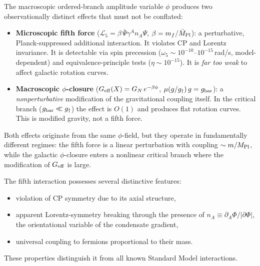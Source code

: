 \documentclass[11pt,a4paper]{article}
\numberwithin{equation}{section}
\begin{document}
The macroscopic ordered-branch amplitude variable $\phi$ produces two
observationally distinct effects that must not be conflated:
\begin{itemize}
\item \textbf{Microscopic fifth force}
  ($\mathcal{L}_5 = \beta\,\bar\Psi\gamma^A n_A\Psi$,
  $\beta = m_f/\bar{M}_{\rm Pl}$):
  a perturbative, Planck-suppressed additional interaction.
  It violates CP and Lorentz invariance.
  It is detectable via spin precession
  ($\omega_5 \sim 10^{-10}$--$10^{-15}\,$rad/s, model-dependent) and
  equivalence-principle tests ($\eta \sim 10^{-15}$).
  It is \emph{far too weak} to affect galactic rotation
  curves.
\item \textbf{Macroscopic $\phi$-closure}
  ($G_{\rm eff}(X) = G_N\,e^{-\beta\phi}$,
  $\mu(g/g_\dagger)\,g = g_{\rm bar}$):
  a \emph{nonperturbative} modification of the gravitational
  coupling itself.
  In the critical branch ($g_{\rm bar} \ll g_\dagger$) the
  effect is $O(1)$ and produces flat rotation curves.
  This is modified gravity, not a fifth force.
\end{itemize}
Both effects originate from the same $\phi$-field, but they
operate in fundamentally different regimes: the fifth force is
a linear perturbation with coupling $\sim m/M_{\rm Pl}$,
while the galactic $\phi$-closure enters a nonlinear critical
branch where the modification of $G_{\rm eff}$ is large.

The fifth interaction possesses several distinctive features:

\begin{itemize}

\item violation of CP symmetry due to its axial structure,

\item apparent Lorentz-symmetry breaking through the presence of
$n_A \equiv \partial_A\Phi/|\partial\Phi|$, the orientational variable
of the condensate gradient,

\item universal coupling to fermions proportional to their mass.

\end{itemize}

These properties distinguish it from all known Standard Model
interactions.
\end{document}
